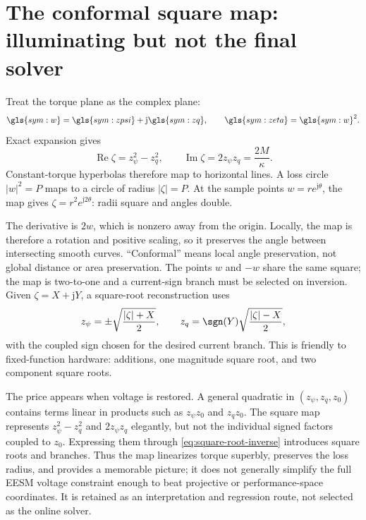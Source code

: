 \section{The conformal square map: illuminating but not the final solver}
\label{sec:conformal}

Treat the torque plane as the complex plane:
\begin{equation}
 \gls{sym:w}=\gls{sym:zpsi}+\mathrm j\gls{sym:zq},\qquad
 \gls{sym:zeta}=\gls{sym:w}^2.
\end{equation}
Exact expansion gives
\begin{equation}
 \operatorname{Re}\zeta=z_\psi^2-z_q^2,\qquad
 \operatorname{Im}\zeta=2z_\psi z_q=\frac{2M}{\kappa}.
 \label{eq:square-map}
\end{equation}
Constant-torque hyperbolas therefore map to horizontal lines. A loss circle
\(|w|^2=P\) maps to a circle of radius \(|\zeta|=P\). At the sample points
\(w=re^{\mathrm j\theta}\), the map gives
\(\zeta=r^2e^{\mathrm j2\theta}\): radii square and angles double.

The derivative is \(2w\), which is nonzero away from the origin. Locally, the
map is therefore a rotation and positive scaling, so it preserves the angle
between intersecting smooth curves. ``Conformal'' means local angle
preservation, not global distance or area preservation. The points \(w\) and
\(-w\) share the same square; the map is two-to-one and a current-sign branch
must be selected on inversion. Given \(\zeta=X+\mathrm jY\), a square-root
reconstruction uses
\begin{equation}
 z_\psi=\pm\sqrt{\frac{|\zeta|+X}{2}},\qquad
 z_q=\sgn(Y)\sqrt{\frac{|\zeta|-X}{2}},
 \label{eq:square-root-inverse}
\end{equation}
with the coupled sign chosen for the desired current branch. This is friendly
to fixed-function hardware: additions, one magnitude square root, and two
component square roots.



The price appears when voltage is restored. A general quadratic in
\((z_\psi,z_q,z_0)\) contains terms linear in products such as
\(z_\psi z_0\) and \(z_qz_0\). The square map represents
\(z_\psi^2-z_q^2\) and \(2z_\psi z_q\) elegantly, but not the individual
signed factors coupled to \(z_0\). Expressing them through
\cref{eq:square-root-inverse} introduces square roots and branches. Thus the
map linearizes torque superbly, preserves the loss radius, and provides a
memorable picture; it does not generally simplify the full EESM voltage
constraint enough to beat projective or performance-space coordinates. It is
retained as an interpretation and regression route, not selected as the
online solver.

